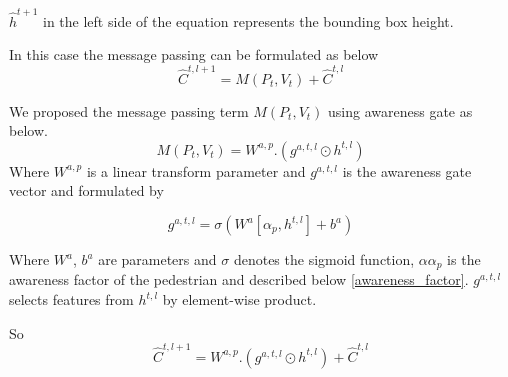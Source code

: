 $ \hat{h}^{t+1}$ in the left side of the equation represents the bounding box height.

In this case the message passing can be formulated as below 
\begin{equation}
\hat{C}^{t, l+1}=M(P_t, V_t) +  \hat{C}^{t, l}
\end{equation}

We proposed the message passing term $M(P_t, V_t)$ using awareness gate as below.
\begin{equation}
M(P_t, V_t) = W^{a,p}.(g^{a,t,l} \odot {h}^{t, l} ) 
\end{equation}
Where $W^{a,p}$ is a linear transform parameter and $g^{a,t,l}$ is the awareness gate vector and formulated by

\begin{equation}
g^{a,t,l} = \sigma(W^{a} [ \alpha_p, {h}^{t, l} ] + b^{a} ) 
\end{equation}

Where $W^{a}$, $b^{a}$ are parameters and $\sigma$ denotes the sigmoid function, $𝛼\alpha_p$ is the awareness factor of the pedestrian and described below \ref{awareness_factor}.
$g^{a,t,l}$ selects features from ${h}^{t, l}$ by element-wise product.

So 
\begin{equation}
\hat{C}^{t, l+1}= W^{a,p}.(g^{a,t,l} \odot {h}^{t, l} )+  \hat{C}^{t, l}
\end{equation}



